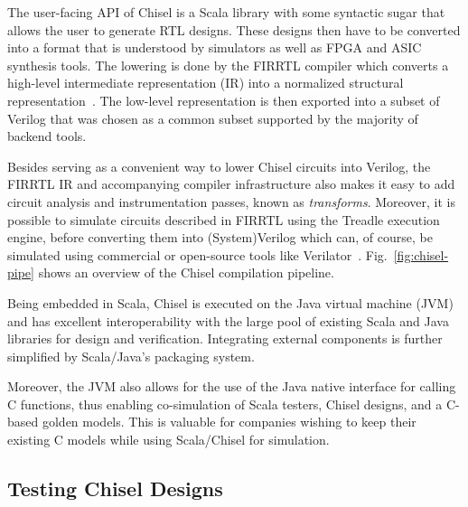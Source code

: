 \documentclass[conference]{IEEEtran}
\begin{document}
The user-facing API of Chisel is a Scala library with some syntactic sugar that allows the user to generate RTL designs.
These designs then have to be converted into a format that is understood by simulators as well as FPGA and ASIC synthesis tools.
The lowering is done by the FIRRTL compiler which converts a high-level intermediate representation (IR) into a normalized structural representation~\cite{firrtl}.
The low-level representation is then exported into a subset of Verilog that was chosen as a common subset supported by the majority of backend tools.

Besides serving as a convenient way to lower Chisel circuits into Verilog, the FIRRTL IR and accompanying compiler infrastructure
also makes it easy to add circuit analysis and instrumentation passes, known as \textit{transforms}. Moreover, it is possible to simulate circuits described in FIRRTL using the Treadle execution engine, before converting them into (System)Verilog which can, of course, be simulated using commercial or open-source tools like Verilator~\cite{verilator}. Fig.~\ref{fig:chisel-pipe} shows an overview of the Chisel compilation pipeline.

Being embedded in Scala, Chisel is executed on the Java virtual machine (JVM) and has excellent 
interoperability with the large pool of existing Scala and Java libraries for design and verification. 
Integrating external components is further simplified by Scala/Java's packaging system.

Moreover, the JVM also allows for the use of the Java native interface for calling C functions, 
thus enabling co-simulation of Scala testers, Chisel designs, and a C-based golden models. This is 
valuable for companies wishing to keep their existing C models while using Scala/Chisel for simulation.


\subsection{Testing Chisel Designs}
\end{document}
